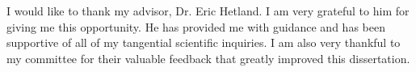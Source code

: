 I would like to thank my advisor, Dr. Eric Hetland. I am very grateful
to him for giving me this opportunity. He has provided me with
guidance and has been supportive of all of my tangential scientific
inquiries. I am also very thankful to my committee for their valuable
feedback that greatly improved this dissertation.



